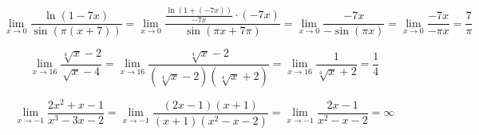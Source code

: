 \documentclass[a4paper,16pt]{article}
\begin{document}

\[
\lim_{x \to 0}\frac{
\ln(1-7x)
}{
\sin(\pi(x+7))
}=
\lim_{x \to 0} \frac{\frac{\ln(1+(-7x))}{-7x}\cdot (-7x) }{\sin(\pi x+7 \pi)}=
\lim_{x \to 0} \frac{-7x}{-\sin(\pi x)}=
\lim_{x \to 0} \frac{-7x}{-\pi x}=
\frac{7}{\pi}
\]

\[
\lim_{x \to 16}\frac{\sqrt[4]{x}-2}{\sqrt{x}-4}=
\lim_{x \to 16}\frac{\sqrt[4]{x}-2}{(\sqrt[4]{x}-2)(\sqrt[4]{x}+2)}=
\lim_{x \to 16}\frac{1}{\sqrt[4]{x}+2}=\frac{1}{4}
\]

\[
\lim_{x \to -1}\frac{2x^2+x-1}{x^3-3x-2}=
\lim_{x \to -1}\frac{(2x-1)(x+1)}{(x+1)(x^2-x-2)}=
\lim_{x \to -1}\frac{2x-1}{x^2-x-2}=\infty
\]
\end{document}
